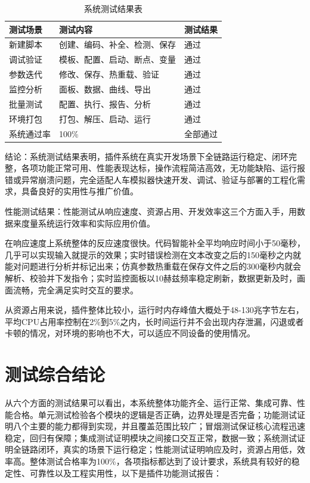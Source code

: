 \begin{table}[H]
\centering
\caption{系统测试结果表}
\label{tab:5-8}
\footnotesize
\renewcommand{\arraystretch}{1.18}
\begin{tabularx}{\textwidth}{p{}Xp{}}
\toprule
测试场景 & 测试内容 & 测试结果 \\
\midrule
新建脚本 & 创建、编码、补全、检测、保存 & 通过 \\
调试验证 & 模板、配置、启动、断点、变量 & 通过 \\
参数迭代 & 修改、保存、热重载、验证 & 通过 \\
监控分析 & 面板、数据、曲线、导出 & 通过 \\
批量测试 & 配置、执行、报告、分析 & 通过 \\
环境打包 & 打包、解压、启动、运行 & 通过 \\
系统通过率 & 100\% & 全部通过 \\
\bottomrule
\end{tabularx}
\end{table}



结论：系统测试结果表明，插件系统在真实开发场景下全链路运行稳定、闭环完整，各项功能正常可用、性能表现达标，操作流程简洁高效，无功能缺陷、运行报错或异常崩溃问题，完全适配人车模拟器快速开发、调试、验证与部署的工程化需求，具备良好的实用性与推广价值。

性能测试结果：性能测试从响应速度、资源占用、开发效率这三个方面入手，用数据来度量系统运行效率和实际应用价值。

在响应速度上系统整体的反应速度很快。代码智能补全平均响应时间小于50毫秒，几乎可以实现输入就提示的效果；实时错误检测在文本改变之后的150毫秒之内就能对问题进行分析并标记出来；仿真参数热重载在保存文件之后的300毫秒内就会解析、校验并下发指令；实时监控面板以10赫兹频率稳定刷新，数据更新及时，画面流畅，完全满足实时交互的要求。

从资源占用来说，插件整体比较小，运行时内存峰值大概处于48-130兆字节左右，平均CPU占用率控制在2\%到5\%之内，长时间运行并不会出现内存泄漏，闪退或者卡顿的情况，对环境的影响也不大，可以适应不同设备的使用情况。

\section{测试综合结论}

从六个方面的测试结果可以看出，本系统整体功能齐全、运行正常、集成可靠、性能合格。单元测试检验各个模块的逻辑是否正确，边界处理是否完备；功能测试证明八个主要的能力都得到实现，并且覆盖范围比较广；冒烟测试保证核心流程迅速稳定，回归有保障；集成测试证明模块之间接口交互正常，数据一致；系统测试证明全链路闭环，真实的场景下运行稳定；性能测试证明响应及时，资源占用低，效率高。整体测试合格率为100\%，各项指标都达到了设计要求，系统具有较好的稳定性、可靠性以及工程实用性，以下是插件功能测试报告：

